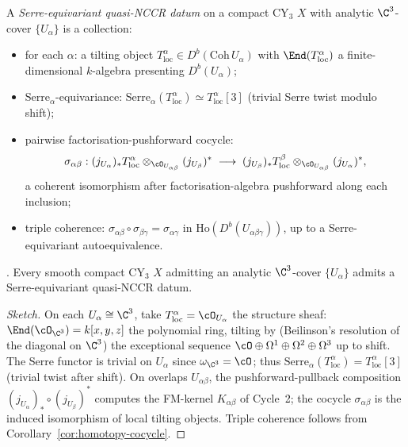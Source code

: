 \begin{definition}
\label{def:serre-eq-quasi-nccr}
A \emph{Serre-equivariant quasi-NCCR datum} on a compact CY$_3$ $X$
with analytic $\C^3$-cover $\{U_\alpha\}$ is a collection:
\begin{itemize}
\item[(i)] for each $\alpha$: a tilting object
$T_{\mathrm{loc}}^\alpha \in D^b(\mathrm{Coh}\, U_\alpha)$ with
$\End(T_{\mathrm{loc}}^\alpha)$ a finite-dimensional $k$-algebra
presenting $D^b(U_\alpha)$;
\item[(ii)] $\mathrm{Serre}_\alpha$-equivariance:
$\mathrm{Serre}_\alpha(T_{\mathrm{loc}}^\alpha) \simeq
T_{\mathrm{loc}}^\alpha[3]$ (trivial Serre twist modulo shift);
\item[(iii)] pairwise factorisation-pushforward cocycle:
\[
  \sigma_{\alpha\beta}: (j_{U_\alpha})_\ast T_{\mathrm{loc}}^\alpha
  \otimes_{\cO_{U_{\alpha\beta}}} (j_{U_\beta})^\ast
  \;\longrightarrow\;
  (j_{U_\beta})_\ast T_{\mathrm{loc}}^\beta
  \otimes_{\cO_{U_{\alpha\beta}}} (j_{U_\alpha})^\ast,
\]
a coherent isomorphism after factorisation-algebra pushforward along
each inclusion;
\item[(iv)] triple coherence: $\sigma_{\alpha\beta} \circ
\sigma_{\beta\gamma} = \sigma_{\alpha\gamma}$ in
$\mathrm{Ho}(D^b(U_{\alpha\beta\gamma}))$, up to a Serre-equivariant
autoequivalence.
\end{itemize}
\end{definition}

\begin{proposition}
\label{prop:quasi-nccr-existence}
\textup{\ClaimStatusProposition.} Every smooth compact CY$_3$ $X$
admitting an analytic $\C^3$-cover $\{U_\alpha\}$ admits a
Serre-equivariant quasi-NCCR datum.
\end{proposition}

\begin{proof}[Sketch]
On each $U_\alpha \cong \C^3$, take $T_{\mathrm{loc}}^\alpha =
\cO_{U_\alpha}$ the structure sheaf: $\End(\cO_{\C^3}) = k[x, y, z]$
the polynomial ring, tilting by (Beilinson's resolution of the
diagonal on $\C^3$) the exceptional sequence $\cO \oplus \Omega^1 \oplus
\Omega^2 \oplus \Omega^3$ up to shift. The Serre functor is trivial
on $U_\alpha$ since $\omega_{\C^3} = \cO$; thus
$\mathrm{Serre}_\alpha(T_{\mathrm{loc}}^\alpha) = T_{\mathrm{loc}}^\alpha[3]$
(trivial twist after shift). On overlaps $U_{\alpha\beta}$, the
pushforward-pullback composition $(j_{U_\alpha})_\ast \circ
(j_{U_\beta})^\ast$ computes the FM-kernel
$K_{\alpha\beta}$ of Cycle~2; the cocycle $\sigma_{\alpha\beta}$ is
the induced isomorphism of local tilting objects. Triple coherence
follows from Corollary~\ref{cor:homotopy-cocycle}.
\end{proof}


